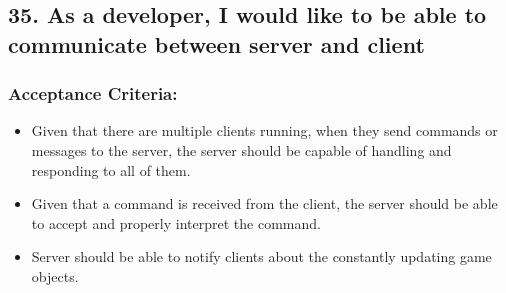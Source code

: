 \subsection*{35. As a developer, I would like to be able to communicate between server and client}


\subsubsection*{Acceptance Criteria:}

\begin{itemize}
\item Given that there are multiple clients running, when they send commands or messages to the server, the server should be capable of handling and responding to all of them.
\item Given that a command is received from the client, the server should be able to accept and properly interpret the command.
\item Server should be able to notify clients about the constantly updating game objects.
\end{itemize}
